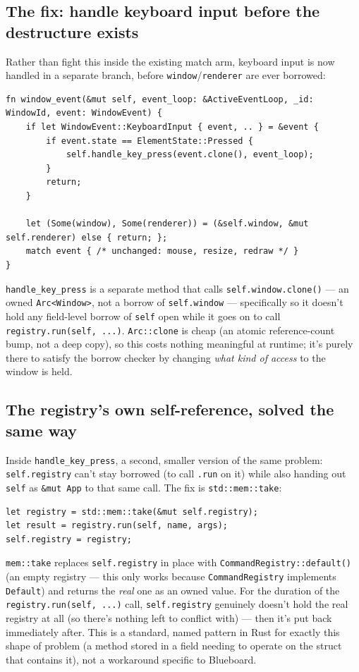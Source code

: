\documentclass[11pt]{article}
\begin{document}
\subsection{The fix: handle keyboard input before the destructure exists}
Rather than fight this inside the existing match arm, keyboard input is now handled in a
separate branch, before \texttt{window}/\texttt{renderer} are ever borrowed:
\begin{lstlisting}
fn window_event(&mut self, event_loop: &ActiveEventLoop, _id: WindowId, event: WindowEvent) {
    if let WindowEvent::KeyboardInput { event, .. } = &event {
        if event.state == ElementState::Pressed {
            self.handle_key_press(event.clone(), event_loop);
        }
        return;
    }

    let (Some(window), Some(renderer)) = (&self.window, &mut self.renderer) else { return; };
    match event { /* unchanged: mouse, resize, redraw */ }
}
\end{lstlisting}
\texttt{handle\_key\_press} is a separate method that calls \texttt{self.window.clone()} —
an owned \texttt{Arc<Window>}, not a borrow of \texttt{self.window} — specifically so it
doesn't hold any field-level borrow of \texttt{self} open while it goes on to call
\texttt{registry.run(self, ...)}. \texttt{Arc::clone} is cheap (an atomic reference-count
bump, not a deep copy), so this costs nothing meaningful at runtime; it's purely there to
satisfy the borrow checker by changing \emph{what kind of access} to the window is held.

\subsection{The registry's own self-reference, solved the same way}
Inside \texttt{handle\_key\_press}, a second, smaller version of the same problem:
\texttt{self.registry} can't stay borrowed (to call \texttt{.run} on it) while also handing
out \texttt{self} as \texttt{\&mut App} to that same call. The fix is
\texttt{std::mem::take}:
\begin{lstlisting}
let registry = std::mem::take(&mut self.registry);
let result = registry.run(self, name, args);
self.registry = registry;
\end{lstlisting}
\texttt{mem::take} replaces \texttt{self.registry} in place with
\texttt{CommandRegistry::default()} (an empty registry — this only works because
\texttt{CommandRegistry} implements \texttt{Default}) and returns the \emph{real} one as an
owned value. For the duration of the \texttt{registry.run(self, ...)} call,
\texttt{self.registry} genuinely doesn't hold the real registry at all (so there's nothing
left to conflict with) — then it's put back immediately after. This is a standard, named
pattern in Rust for exactly this shape of problem (a method stored in a field needing to
operate on the struct that contains it), not a workaround specific to Blueboard.
\end{document}
